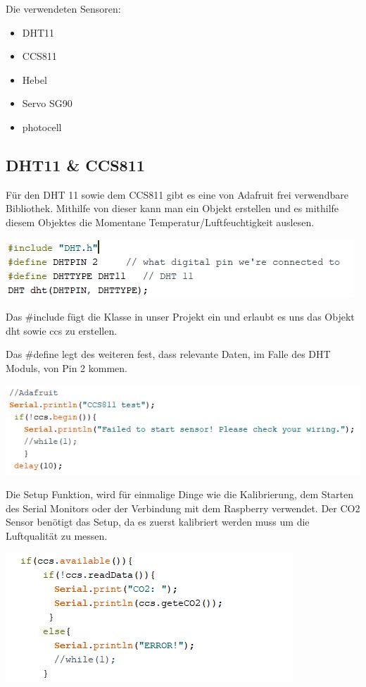 Die verwendeten Sensoren:

\begin{itemize}
	\item DHT11
	\item CCS811
	\item Hebel
	\item Servo SG90
	\item photocell
\end{itemize}


\subsection{DHT11 \& CCS811}

Für den DHT 11 sowie dem CCS811 gibt es eine von Adafruit frei verwendbare Bibliothek. Mithilfe von dieser kann man ein Objekt erstellen und es mithilfe diesem Objektes die Momentane Temperatur/Luftfeuchtigkeit auslesen.


	\includegraphics[width=0.9\linewidth]{../Bilder/Programmierung/define(DHTCCS)}



Das \#include fügt die Klasse in unser Projekt ein und erlaubt es uns das Objekt dht sowie ccs zu erstellen.

Das \#define legt des weiteren fest, dass relevante Daten, im Falle des DHT Moduls, von Pin 2 kommen. 


	\includegraphics[width=1.2\linewidth]{../Bilder/Programmierung/setup(CCS)}



Die Setup Funktion, wird für einmalige Dinge wie die Kalibrierung, dem Starten des Serial Monitors oder der Verbindung mit dem Raspberry verwendet. Der CO2 Sensor benötigt das Setup, da es zuerst kalibriert werden muss um die Luftqualität zu messen.

	\includegraphics[width=0.9\linewidth]{../Bilder/Programmierung/loop(DHTCCS)}



